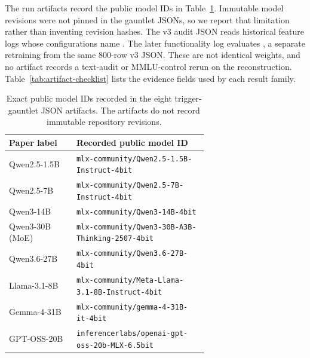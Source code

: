 \documentclass{article}
\begin{document}
The run artifacts record the public model IDs in Table~\ref{tab:model-ids}. Immutable model revisions were not pinned in the gauntlet JSONs, so we report that limitation rather than inventing revision hashes. The v3 audit JSON reads historical feature logs whose configurations name . The later functionality log evaluates , a separate retraining from the same 800-row v3 JSON. These are not identical weights, and no artifact records a text-audit or MMLU-control rerun on the reconstruction. Table~\ref{tab:artifact-checklist} lists the evidence fields used by each result family.

\begin{table}[h]
\begin{center}
\scriptsize
\begin{tabular}{@{}lp{0.66\linewidth}@{}}
\toprule
\textbf{Paper label} & \textbf{Recorded public model ID} \\
\midrule
Qwen2.5-1.5B & \texttt{mlx-community/Qwen2.5-1.5B-Instruct-4bit} \\
Qwen2.5-7B & \texttt{mlx-community/Qwen2.5-7B-Instruct-4bit} \\
Qwen3-14B & \texttt{mlx-community/Qwen3-14B-4bit} \\
Qwen3-30B (MoE) & \texttt{mlx-community/Qwen3-30B-A3B-Thinking-2507-4bit} \\
Qwen3.6-27B & \texttt{mlx-community/Qwen3.6-27B-4bit} \\
Llama-3.1-8B & \texttt{mlx-community/Meta-Llama-3.1-8B-Instruct-4bit} \\
Gemma-4-31B & \texttt{mlx-community/gemma-4-31B-it-4bit} \\
GPT-OSS-20B & \texttt{inferencerlabs/openai-gpt-oss-20b-MLX-6.5bit} \\
\bottomrule
\end{tabular}
\end{center}
\caption{Exact public model IDs recorded in the eight trigger-gauntlet JSON artifacts. The artifacts do not record immutable repository revisions.}
\label{tab:model-ids}
\end{table}
\end{document}
